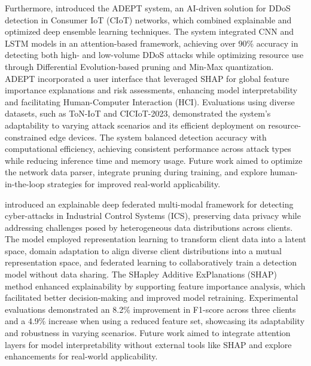 Furthermore, \citet{saiyed2024interactive} introduced the ADEPT system, an AI-driven solution for DDoS detection in Consumer IoT (CIoT) networks, which combined explainable and optimized deep ensemble learning techniques. The system integrated CNN and LSTM models in an attention-based framework, achieving over 90\% accuracy in detecting both high- and low-volume DDoS attacks while optimizing resource use through Differential Evolution-based pruning and Min-Max quantization. ADEPT incorporated a user interface that leveraged SHAP for global feature importance explanations and risk assessments, enhancing model interpretability and facilitating Human-Computer Interaction (HCI). Evaluations using diverse datasets, such as ToN-IoT and CICIoT-2023, demonstrated the system's adaptability to varying attack scenarios and its efficient deployment on resource-constrained edge devices. The system balanced detection accuracy with computational efficiency, achieving consistent performance across attack types while reducing inference time and memory usage. Future work aimed to optimize the network data parser, integrate pruning during training, and explore human-in-the-loop strategies for improved real-world applicability.

\citet{bahadoripour2024explainable} introduced an explainable deep federated multi-modal framework for detecting cyber-attacks in Industrial Control Systems (ICS), preserving data privacy while addressing challenges posed by heterogeneous data distributions across clients. The model employed representation learning to transform client data into a latent space, domain adaptation to align diverse client distributions into a mutual representation space, and federated learning to collaboratively train a detection model without data sharing. The SHapley Additive ExPlanations (SHAP) method enhanced explainability by supporting feature importance analysis, which facilitated better decision-making and improved model retraining. Experimental evaluations demonstrated an 8.2\% improvement in F1-score across three clients and a 4.9\% increase when using a reduced feature set, showcasing its adaptability and robustness in varying scenarios. Future work aimed to integrate attention layers for model interpretability without external tools like SHAP and explore enhancements for real-world applicability.

